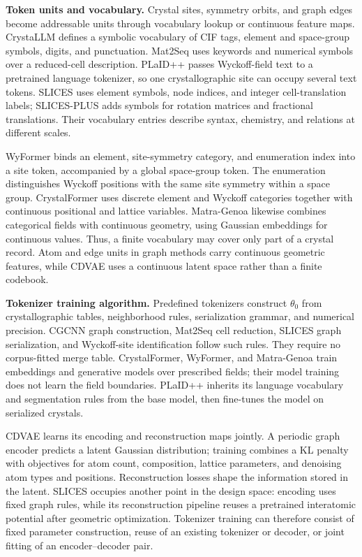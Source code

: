 \textbf{Token units and vocabulary.}
Crystal sites, symmetry orbits, and graph edges become addressable units through vocabulary lookup or continuous feature maps. CrystaLLM defines a symbolic vocabulary of CIF tags, element and space-group symbols, digits, and punctuation. Mat2Seq uses keywords and numerical symbols over a reduced-cell description. PLaID++ passes Wyckoff-field text to a pretrained language tokenizer, so one crystallographic site can occupy several text tokens. SLICES uses element symbols, node indices, and integer cell-translation labels; SLICES-PLUS adds symbols for rotation matrices and fractional translations. Their vocabulary entries describe syntax, chemistry, and relations at different scales.

WyFormer binds an element, site-symmetry category, and enumeration index into a site token, accompanied by a global space-group token. The enumeration distinguishes Wyckoff positions with the same site symmetry within a space group. CrystalFormer uses discrete element and Wyckoff categories together with continuous positional and lattice variables. Matra-Genoa likewise combines categorical fields with continuous geometry, using Gaussian embeddings for continuous values. Thus, a finite vocabulary may cover only part of a crystal record. Atom and edge units in graph methods carry continuous geometric features, while CDVAE uses a continuous latent space rather than a finite codebook.

\textbf{Tokenizer training algorithm.}
Predefined tokenizers construct $\theta_0$ from crystallographic tables, neighborhood rules, serialization grammar, and numerical precision. CGCNN graph construction, Mat2Seq cell reduction, SLICES graph serialization, and Wyckoff-site identification follow such rules. They require no corpus-fitted merge table. CrystalFormer, WyFormer, and Matra-Genoa train embeddings and generative models over prescribed fields; their model training does not learn the field boundaries. PLaID++ inherits its language vocabulary and segmentation rules from the base model, then fine-tunes the model on serialized crystals.

CDVAE learns its encoding and reconstruction maps jointly. A periodic graph encoder predicts a latent Gaussian distribution; training combines a KL penalty with objectives for atom count, composition, lattice parameters, and denoising atom types and positions. Reconstruction losses shape the information stored in the latent. SLICES occupies another point in the design space: encoding uses fixed graph rules, while its reconstruction pipeline reuses a pretrained interatomic potential after geometric optimization. Tokenizer training can therefore consist of fixed parameter construction, reuse of an existing tokenizer or decoder, or joint fitting of an encoder--decoder pair.

